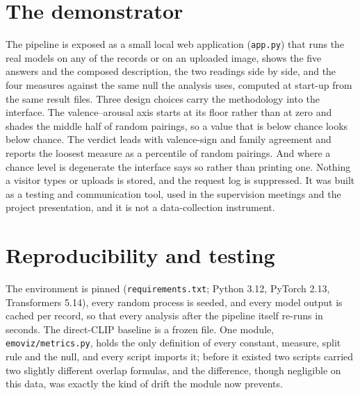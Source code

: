 \section{The demonstrator}
\label{sec:method-demo}

The pipeline is exposed as a small local web application (\texttt{app.py}) that runs the real models on any of the \nAnalysed{} records or on an uploaded image, shows the five answers and the composed description, the two readings side by side, and the four measures against the same null the analysis uses, computed at start-up from the same result files. Three design choices carry the methodology into the interface. The valence--arousal axis starts at its floor rather than at zero and shades the middle half of random pairings, so a value that is below chance looks below chance. The verdict leads with valence-sign and family agreement and reports the loosest measure as a percentile of random pairings. And where a chance level is degenerate the interface says so rather than printing one. Nothing a visitor types or uploads is stored, and the request log is suppressed. It was built as a testing and communication tool, used in the supervision meetings and the project presentation, and it is not a data-collection instrument.


\section{Reproducibility and testing}
\label{sec:method-repro}

The environment is pinned (\texttt{requirements.txt}; Python 3.12, PyTorch 2.13, Transformers 5.14), every random process is seeded, and every model output is cached per record, so that every analysis after the pipeline itself re-runs in seconds. The direct-CLIP baseline is a frozen file. One module, \texttt{emoviz/metrics.py}, holds the only definition of every constant, measure, split rule and the null, and every script imports it; before it existed two scripts carried two slightly different overlap formulas, and the difference, though negligible on this data, was exactly the kind of drift the module now prevents.

